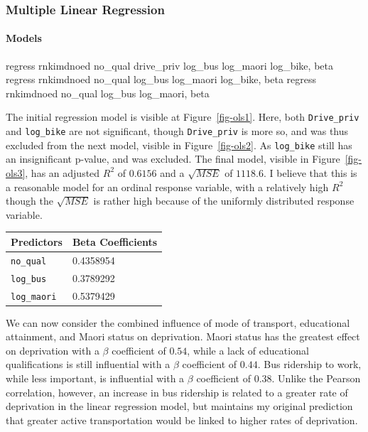 \documentclass[
  letterpaper,
  DIV=11,
  numbers=noendperiod,
  oneside]{scrartcl}
\let\oldparagraph\paragraph
\renewcommand{\paragraph}[1]{\oldparagraph{#1}\mbox{}}
\newenvironment{Shaded}{\begin{snugshade}}{\end{snugshade}}
\newcommand{\KeywordTok}[1]{\textcolor[rgb]{0.00,0.23,0.31}{#1}}
\newcommand{\NormalTok}[1]{\textcolor[rgb]{0.00,0.23,0.31}{#1}}
\begin{document}
\hypertarget{multiple-linear-regression-1}{%
\subsubsection{Multiple Linear
Regression}\label{multiple-linear-regression-1}}

\hypertarget{models}{%
\paragraph{Models}\label{models}}

\begin{Shaded}
\begin{Highlighting}[]
\KeywordTok{regress}\NormalTok{ rnkimdnoed no\_qual drive\_priv log\_bus log\_maori log\_bike, beta}
\KeywordTok{regress}\NormalTok{ rnkimdnoed no\_qual log\_bus log\_maori log\_bike, beta}
\KeywordTok{regress}\NormalTok{ rnkimdnoed no\_qual log\_bus log\_maori, beta}
\end{Highlighting}
\end{Shaded}

The initial regression model is visible at Figure~\ref{fig-ols1}. Here,
both \texttt{Drive\_priv} and \texttt{log\_bike} are not significant,
though \texttt{Drive\_priv} is more so, and was thus excluded from the
next model, visible in Figure~\ref{fig-ols2}. As \texttt{log\_bike}
still has an insignificant p-value, and was excluded. The final model,
visible in Figure~\ref{fig-ols3}, has an adjusted \(R^2\) of \(0.6156\)
and a \(\sqrt{MSE}\) of \(1118.6\). I believe that this is a reasonable
model for an ordinal response variable, with a relatively high \(R^2\)
though the \(\sqrt{MSE}\) is rather high because of the uniformly
distributed response variable.

\begin{longtable}[]{@{}ll@{}}
\toprule\noalign{}
Predictors & Beta Coefficients \\
\midrule\noalign{}
\endhead
\bottomrule\noalign{}
\endlastfoot
\texttt{no\_qual} & 0.4358954 \\
\texttt{log\_bus} & 0.3789292 \\
\texttt{log\_maori} & 0.5379429 \\
\end{longtable}

We can now consider the combined influence of mode of transport,
educational attainment, and Maori status on deprivation. Maori status
has the greatest effect on deprivation with a \(\beta\) coefficient of
\(0.54\), while a lack of educational qualifications is still
influential with a \(\beta\) coefficient of \(0.44\). Bus ridership to
work, while less important, is influential with a \(\beta\) coefficient
of \(0.38\). Unlike the Pearson correlation, however, an increase in bus
ridership is related to a greater rate of deprivation in the linear
regression model, but maintains my original prediction that greater
active transportation would be linked to higher rates of deprivation.
\end{document}
